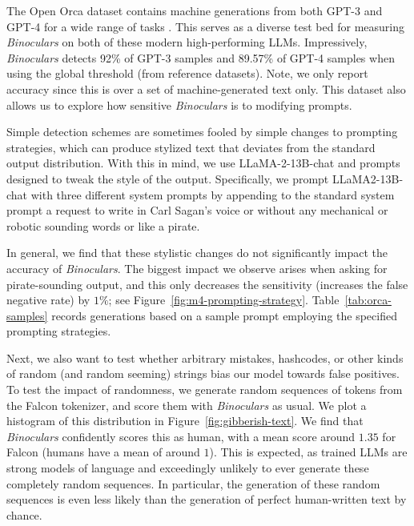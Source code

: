 \documentclass{article} %
\begin{document}
The Open Orca dataset contains machine generations from both GPT-3 and GPT-4 for a wide range of tasks \citep{OpenOrca}.
This serves as a diverse test bed for measuring \emph{Binoculars} on both of these modern high-performing LLMs.
Impressively, \emph{Binoculars} detects 92\% of GPT-3 samples and 89.57\% of GPT-4 samples when using the global threshold (from reference datasets). Note, we only report accuracy since this is over a set of machine-generated text only.
This dataset also allows us to explore how sensitive \emph{Binoculars} is to modifying prompts.

Simple detection schemes are sometimes fooled by simple changes to prompting strategies, which can produce stylized text that deviates from the standard output distribution.
With this in mind, we use LLaMA-2-13B-chat and prompts designed to tweak the style of the output.
Specifically, we prompt LLaMA2-13B-chat with three different system prompts by appending to the standard system prompt a request to write in Carl Sagan's voice or without any mechanical or robotic sounding words or like a pirate. 

In general, we find that these stylistic changes do not significantly impact the accuracy of {\em Binoculars}.
The biggest impact we observe arises when asking for pirate-sounding output, and this only decreases the sensitivity (increases the false negative rate) by $1\%$; see Figure~\ref{fig:m4-prompting-strategy}. Table~\ref{tab:orca-samples} records generations based on a sample prompt employing the specified prompting strategies.

%     

Next, we also want to test whether arbitrary mistakes, hashcodes, or other kinds of random (and random seeming) strings bias our model towards false positives.  
To test the impact of randomness, we generate random sequences of tokens from the Falcon tokenizer, and score them with \textit{Binoculars} as usual. 
We plot a histogram of this distribution in Figure~\ref{fig:gibberish-text}.
We find that {\em Binoculars} confidently scores this as human, with a mean score around $1.35$ for Falcon (humans have a mean of around $1$).
This is expected, as trained LLMs are strong models of language and exceedingly unlikely to ever generate these completely random sequences. In particular, the generation of these random sequences is even less likely than the generation of perfect human-written text by chance. 
\end{document}
